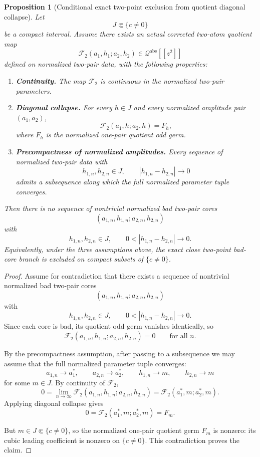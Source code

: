\documentclass[11pt,a4paper]{amsart}
\theoremstyle{plain}
\newtheorem{proposition}[theorem]{Proposition}
\theoremstyle{definition}
\newcommand{\Qabs}{\mathcal Q^{\mathrm{abs}}}
\begin{document}
\begin{proposition}[Conditional exact two-point exclusion from quotient diagonal collapse]
\label{prop:conditional-exact-two-point-exclusion-qabs}
Let
\[
J\Subset\{c\neq 0\}
\]
be a compact interval. Assume there exists an actual corrected two-atom quotient
map
\[
\mathcal F_2(a_1,h_1;a_2,h_2)\in \Qabs[[z^2]]
\]
defined on normalized two-pair data, with the following properties:

\begin{enumerate}
\item \textbf{Continuity.}
The map $\mathcal F_2$ is continuous in the normalized two-pair parameters.

\item \textbf{Diagonal collapse.}
For every $h\in J$ and every normalized amplitude pair $(a_1,a_2)$,
\[
\mathcal F_2(a_1,h;a_2,h)=F_h,
\]
where $F_h$ is the normalized one-pair quotient odd germ.

\item \textbf{Precompactness of normalized amplitudes.}
Every sequence of normalized two-pair data with
\[
h_{1,n},h_{2,n}\in J,
\qquad
|h_{1,n}-h_{2,n}|\to 0
\]
admits a subsequence along which the full normalized parameter tuple converges.
\end{enumerate}

Then there is no sequence of nontrivial normalized bad two-pair cores
\[
(a_{1,n},h_{1,n};a_{2,n},h_{2,n})
\]
with
\[
h_{1,n},h_{2,n}\in J,
\qquad
0<|h_{1,n}-h_{2,n}|\to 0.
\]
Equivalently, under the three assumptions above, the exact close two-point
bad-core branch is excluded on compact subsets of $\{c\neq 0\}$.
\end{proposition}

\begin{proof}
Assume for contradiction that there exists a sequence of nontrivial normalized
bad two-pair cores
\[
(a_{1,n},h_{1,n};a_{2,n},h_{2,n})
\]
with
\[
h_{1,n},h_{2,n}\in J,
\qquad
0<|h_{1,n}-h_{2,n}|\to 0.
\]
Since each core is bad, its quotient odd germ vanishes identically, so
\[
\mathcal F_2(a_{1,n},h_{1,n};a_{2,n},h_{2,n})=0
\qquad
\text{for all }n.
\]

By the precompactness assumption, after passing to a subsequence we may assume
that the full normalized parameter tuple converges:
\[
a_{1,n}\to a_1^*,
\qquad
a_{2,n}\to a_2^*,
\qquad
h_{1,n}\to m,
\qquad
h_{2,n}\to m
\]
for some $m\in J$. By continuity of $\mathcal F_2$,
\[
0
=
\lim_{n\to\infty}
\mathcal F_2(a_{1,n},h_{1,n};a_{2,n},h_{2,n})
=
\mathcal F_2(a_1^*,m;a_2^*,m).
\]
Applying diagonal collapse gives
\[
0=\mathcal F_2(a_1^*,m;a_2^*,m)=F_m.
\]

But $m\in J\Subset\{c\neq 0\}$, so the normalized one-pair quotient germ
$F_m$ is nonzero: its cubic leading coefficient is nonzero on $\{c\neq 0\}$.
This contradiction proves the claim.
\end{proof}
\end{document}
